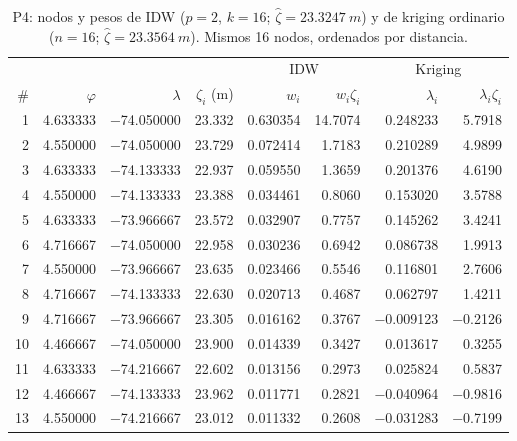 \documentclass[11pt,letterpaper]{article}
\begin{document}
\begin{table}[H]
\centering
\caption{P4: nodos y pesos de IDW ($p=2$, $k=16$; $\hat\zeta=\SI{23.3247}{m}$) y de kriging
ordinario ($n=16$; $\hat\zeta=\SI{23.3564}{m}$). Mismos 16 nodos, ordenados por distancia.}
\label{tab:nodos_idw_ko}
\small
\begin{tabular}{@{}rrrrrrrr@{}}
\toprule
& & & & \multicolumn{2}{c}{IDW} & \multicolumn{2}{c}{Kriging} \\
\cmidrule(lr){5-6}\cmidrule(l){7-8}
\# & $\varphi$ & $\lambda$ & $\zeta_i$ (m) & $w_i$ & $w_i\zeta_i$ & $\lambda_i$ & $\lambda_i\zeta_i$ \\
\midrule
1 & \num{4.633333} & \num{-74.050000} & \num{23.332} & \num{0.630354} & \num{14.7074} & \num{0.248233} & \num{5.7918} \\
2 & \num{4.550000} & \num{-74.050000} & \num{23.729} & \num{0.072414} & \num{1.7183} & \num{0.210289} & \num{4.9899} \\
3 & \num{4.633333} & \num{-74.133333} & \num{22.937} & \num{0.059550} & \num{1.3659} & \num{0.201376} & \num{4.6190} \\
4 & \num{4.550000} & \num{-74.133333} & \num{23.388} & \num{0.034461} & \num{0.8060} & \num{0.153020} & \num{3.5788} \\
5 & \num{4.633333} & \num{-73.966667} & \num{23.572} & \num{0.032907} & \num{0.7757} & \num{0.145262} & \num{3.4241} \\
6 & \num{4.716667} & \num{-74.050000} & \num{22.958} & \num{0.030236} & \num{0.6942} & \num{0.086738} & \num{1.9913} \\
7 & \num{4.550000} & \num{-73.966667} & \num{23.635} & \num{0.023466} & \num{0.5546} & \num{0.116801} & \num{2.7606} \\
8 & \num{4.716667} & \num{-74.133333} & \num{22.630} & \num{0.020713} & \num{0.4687} & \num{0.062797} & \num{1.4211} \\
9 & \num{4.716667} & \num{-73.966667} & \num{23.305} & \num{0.016162} & \num{0.3767} & \num{-0.009123} & \num{-0.2126} \\
10 & \num{4.466667} & \num{-74.050000} & \num{23.900} & \num{0.014339} & \num{0.3427} & \num{0.013617} & \num{0.3255} \\
11 & \num{4.633333} & \num{-74.216667} & \num{22.602} & \num{0.013156} & \num{0.2973} & \num{0.025824} & \num{0.5837} \\
12 & \num{4.466667} & \num{-74.133333} & \num{23.962} & \num{0.011771} & \num{0.2821} & \num{-0.040964} & \num{-0.9816} \\
13 & \num{4.550000} & \num{-74.216667} & \num{23.012} & \num{0.011332} & \num{0.2608} & \num{-0.031283} & \num{-0.7199} \\

\end{tabular}
\end{table}
\end{document}
